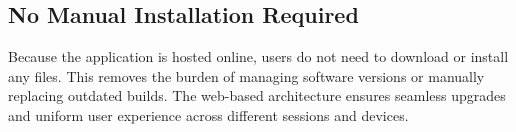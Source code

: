 \subsection{No Manual Installation Required}
Because the application is hosted online, users do not need to download or install any files. This removes the burden of managing software versions or manually replacing outdated builds. The web-based architecture ensures seamless upgrades and uniform user experience across different sessions and devices.




